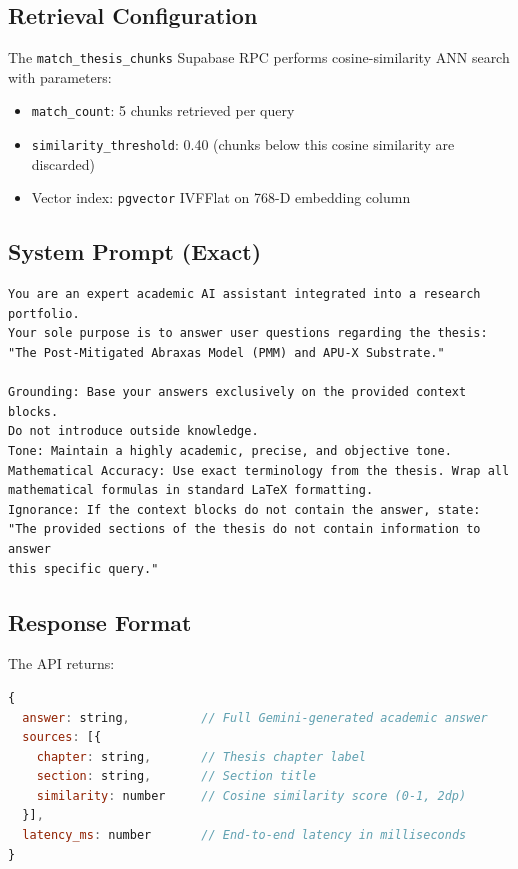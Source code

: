 \documentclass[12pt, a4paper]{article}
\begin{document}
\subsection{Retrieval Configuration}

The \texttt{match\_thesis\_chunks} Supabase RPC performs cosine-similarity ANN search
with parameters:
\begin{itemize}[noitemsep]
  \item \texttt{match\_count}: 5 chunks retrieved per query
  \item \texttt{similarity\_threshold}: 0.40 (chunks below this cosine similarity are discarded)
  \item Vector index: \texttt{pgvector} IVFFlat on 768-D embedding column
\end{itemize}

\subsection{System Prompt (Exact)}

\begin{lstlisting}[language={}, caption={AI System Prompt — api/query-thesis.js}]
You are an expert academic AI assistant integrated into a research portfolio.
Your sole purpose is to answer user questions regarding the thesis:
"The Post-Mitigated Abraxas Model (PMM) and APU-X Substrate."

Grounding: Base your answers exclusively on the provided context blocks.
Do not introduce outside knowledge.
Tone: Maintain a highly academic, precise, and objective tone.
Mathematical Accuracy: Use exact terminology from the thesis. Wrap all
mathematical formulas in standard LaTeX formatting.
Ignorance: If the context blocks do not contain the answer, state:
"The provided sections of the thesis do not contain information to answer
this specific query."
\end{lstlisting}

\subsection{Response Format}

The API returns:
\begin{lstlisting}[language=javascript, caption={API response schema (api/query-thesis.js)}]
{
  answer: string,          // Full Gemini-generated academic answer
  sources: [{
    chapter: string,       // Thesis chapter label
    section: string,       // Section title
    similarity: number     // Cosine similarity score (0-1, 2dp)
  }],
  latency_ms: number       // End-to-end latency in milliseconds
}
\end{lstlisting}
\end{document}
